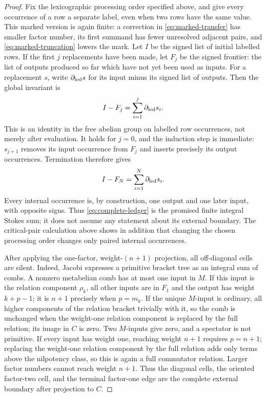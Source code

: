 \documentclass[11pt]{amsart}
\theoremstyle{remark}
\begin{document}
\begin{proof}
	Fix the lexicographic processing order specified above, and give every
	occurrence of a row a separate label, even when two rows have the same
	value.  This marked version is again finite: a correction in
	\eqref{eq:marked-transfer} has smaller factor number, its first summand
	has fewer unresolved adjacent pairs, and
	\eqref{eq:marked-truncation} lowers the mark.  Let $I$ be the signed
	list of initial labelled rows.  If the
	first $j$ replacements have been made, let $F_j$ be the signed
	frontier: the list of outputs produced so far which have not yet been
	used as inputs.  For a replacement $s$, write
	$\partial_{\rm led}s$ for its input minus its signed list of outputs.
	Then the global invariant is
	\begin{equation}\label{eq:prefix-ledger}
	 I-F_j=\sum_{i=1}^{j}\partial_{\rm led}s_i .
	\end{equation}
	This is an identity in the free abelian group on labelled row
	occurrences, not merely after evaluation.  It holds for $j=0$, and the
	induction step is immediate: $s_{j+1}$ removes its input occurrence
	from $F_j$ and inserts precisely its output occurrences.  Termination
	therefore gives
	\begin{equation}\label{eq:complete-ledger}
	 I-F_N=\sum_{i=1}^{N}\partial_{\rm led}s_i.
	\end{equation}
	Every internal occurrence is, by construction, one output and one
	later input, with opposite signs.  Thus
	\eqref{eq:complete-ledger} is the promised finite integral Stokes sum;
	it does not assume any statement about its external boundary.  The
	critical-pair calculation above shows in addition that changing the
	chosen processing order changes only paired internal occurrences.

After applying the one-factor, weight-$(n+1)$ projection, all
off-diagonal cells are silent.  Indeed, Jacobi expresses a primitive
bracket tree as an integral sum of combs.  A nonzero metabelian comb has
at most one input in $M$.  If this input is the relation component
$\rho_k$, all other inputs are in $F_1$ and the output has weight
$k+p-1$; it is $n+1$ precisely when $p=m_k$.  If the unique $M$-input
is ordinary, all higher components of the relation bracket trivially
with it, so the comb is unchanged when the weight-one relation component
is replaced by the full relation; its image in $C$ is zero.  Two
$M$-inputs give zero, and a spectator is not primitive.  If every input
has weight one, reaching weight $n+1$ requires $p=n+1$; replacing the
weight-one relation component by the full relation adds only terms above
the nilpotency class, so this is again a full commutator relation.
Larger factor numbers cannot reach weight $n+1$.  Thus the
diagonal cells, the oriented factor-two cell, and the terminal
factor-one edge are the complete external boundary after projection to
$C$.


\end{proof}
\end{document}
